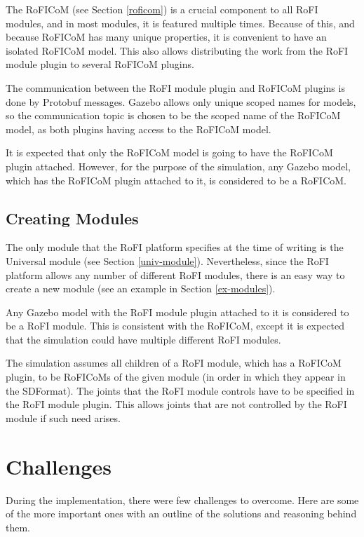 \documentclass[
  printed, %
  color,   %
  notable, %
  oneside, %
  nolof,   %
  nolot,   %
  nocover,
]{fithesis3}
\begin{document}
The RoFICoM (see Section \ref{roficom}) is a crucial component to all RoFI modules, and in most modules, it is featured multiple times.
Because of this, and because RoFICoM has many unique properties, it is convenient to have an isolated RoFICoM model.
This also allows distributing the work from the RoFI module plugin to several RoFICoM plugins.

The communication between the RoFI module plugin and RoFICoM plugins is done by Protobuf messages.
Gazebo allows only unique scoped names for models, so the communication topic is chosen to be the scoped name of the RoFICoM model, as both plugins having access to the RoFICoM model.

It is expected that only the RoFICoM model is going to have the RoFICoM plugin attached.
However, for the purpose of the simulation, any Gazebo model, which has the RoFICoM plugin attached to it, is considered to be a RoFICoM.

\subsection{Creating Modules}

The only module that the RoFI platform specifies at the time of writing is the Universal module (see Section \ref{univ-module}).
Nevertheless, since the RoFI platform allows any number of different RoFI modules, there is an easy way to create a new module (see an example in Section \ref{ex-modules}).

Any Gazebo model with the RoFI module plugin attached to it is considered to be a RoFI module.
This is consistent with the RoFICoM, except it is expected that the simulation could have multiple different RoFI modules.

The simulation assumes all children of a RoFI module, which has a RoFICoM plugin, to be RoFICoMs of the given module (in order in which they appear in the SDFormat).
The joints that the RoFI module controls have to be specified in the RoFI module plugin.
This allows joints that are not controlled by the RoFI module if such need arises.

\section{Challenges}

During the implementation, there were few challenges to overcome.
Here are some of the more important ones with an outline of the solutions and reasoning behind them.
\end{document}
